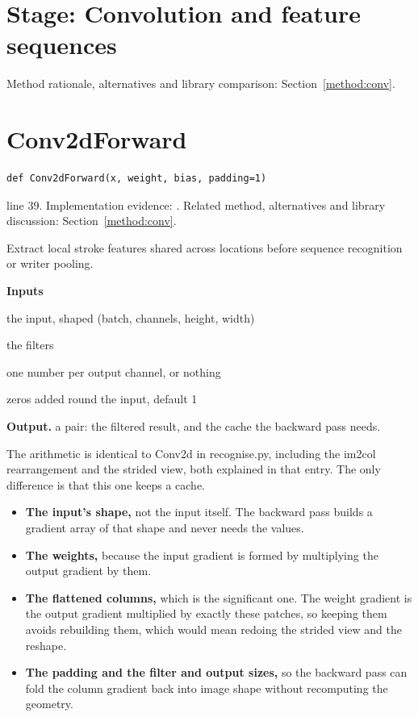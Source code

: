 \section*{Stage: Convolution and feature sequences}
Method rationale, alternatives and library comparison: Section~\ref{method:conv}.
\section{Conv2dForward}\label{fn:train:Conv2dForward}
\begin{lstlisting}[style=sig]
def Conv2dForward(x, weight, bias, padding=1)
\end{lstlisting}
 line 39. Implementation evidence: \cite{code2026}. Related method, alternatives and library discussion: Section~\ref{method:conv}.


Extract local stroke features shared across locations before sequence recognition or writer pooling.




\noindent\textbf{Inputs}
\begin{description}[leftmargin=2.2em,style=nextline,font=\normalfont\ttfamily]\setlength\itemsep{1pt}
  \item[{x}] \normalfont the input, shaped (batch, channels, height, width)
  \item[{weight}] \normalfont the filters
  \item[{bias}] \normalfont one number per output channel, or nothing
  \item[{padding}] \normalfont zeros added round the input, default 1
\end{description}

\noindent\textbf{Output.} a pair: the filtered result, and the cache the backward pass needs.


The arithmetic is identical to Conv2d in recognise.py, including the im2col rearrangement and the strided view, both explained in that entry. The only difference is that this one keeps a cache.



\begin{itemize}\setlength\itemsep{0pt}
  \item \textbf{The input's shape,} not the input itself. The backward pass builds a gradient array of that shape and never needs the values.
  \item \textbf{The weights,} because the input gradient is formed by multiplying the output gradient by them.
  \item \textbf{The flattened columns,} which is the significant one. The weight gradient is the output gradient multiplied by exactly these patches, so keeping them avoids rebuilding them, which would mean redoing the strided view and the reshape.
  \item \textbf{The padding and the filter and output sizes,} so the backward pass can fold the column gradient back into image shape without recomputing the geometry.
\end{itemize}

